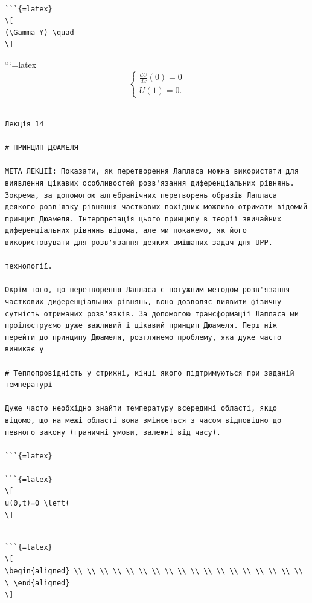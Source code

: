 \documentclass[
]{article}
\begin{document}
\begin{verbatim}

```{=latex}
\[
(\Gamma Y) \quad
\]
\end{verbatim}

```{=latex}
\[
\begin{cases} \frac{dU}{dx} (0) = 0 \\ U(1) = 0. \end{cases}
\]

\begin{verbatim}

Лекція 14

# ПРИНЦИП ДЮАМЕЛЯ

МЕТА ЛЕКЦІЇ: Показати, як перетворення Лапласа можна використати для виявлення цікавих особливостей розв'язання диференціальних рівнянь. Зокрема, за допомогою алгебранічних перетворень образів Лапласа деякого розв'язку рівняння часткових похідних можливо отримати відомий принцип Дюамеля. Інтерпретація цього принципу в теорії звичайних диференціальних рівнянь відома, але ми покажемо, як його використовувати для розв'язання деяких змішаних задач для UPP.

технології.

Окрім того, що перетворення Лапласа є потужним методом розв'язання часткових диференціальних рівнянь, воно дозволяє виявити фізичну сутність отриманих розв'язків. За допомогою трансформації Лапласа ми проілюструємо дуже важливий і цікавий принцип Дюамеля. Перш ніж перейти до принципу Дюамеля, розглянемо проблему, яка дуже часто виникає у

# Теплопровідність у стрижні, кінці якого підтримуються при заданій температурі

Дуже часто необхідно знайти температуру всередині області, якщо відомо, що на межі області вона змінюється з часом відповідно до певного закону (граничні умови, залежні від часу).

```{=latex}

```{=latex}
\[
u(0,t)=0 \left(
\]
\end{verbatim}

\begin{verbatim}

```{=latex}
\[
\begin{aligned} \\ \\ \\ \\ \\ \\ \\ \\ \\ \\ \\ \\ \\ \\ \\ \\ \\ \\ \ \end{aligned}
\]
\end{verbatim}
\end{document}
